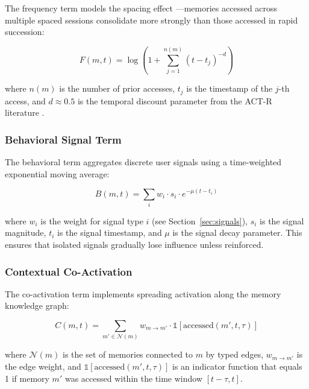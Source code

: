 \documentclass[11pt,a4paper]{article}
\begin{document}
The frequency term models the spacing effect \citep{cepeda2006distributed}---memories accessed across multiple spaced sessions consolidate more strongly than those accessed in rapid succession:

\begin{equation}
F(m, t) = \log\left(1 + \sum_{j=1}^{n(m)} (t - t_j)^{-d}\right)
\label{eq:frequency}
\end{equation}

\noindent where $n(m)$ is the number of prior accesses, $t_j$ is the timestamp of the $j$-th access, and $d \approx 0.5$ is the temporal discount parameter from the ACT-R literature \citep{anderson1991reflections}.

\subsubsection{Behavioral Signal Term}
\label{sec:behavioral}

The behavioral term aggregates discrete user signals using a time-weighted exponential moving average:

\begin{equation}
B(m, t) = \sum_{i} w_i \cdot s_i \cdot e^{-\mu(t - t_i)}
\label{eq:behavioral}
\end{equation}

\noindent where $w_i$ is the weight for signal type $i$ (see Section~\ref{sec:signals}), $s_i$ is the signal magnitude, $t_i$ is the signal timestamp, and $\mu$ is the signal decay parameter. This ensures that isolated signals gradually lose influence unless reinforced.

\subsubsection{Contextual Co-Activation}
\label{sec:coactivation}

The co-activation term implements spreading activation along the memory knowledge graph:

\begin{equation}
C(m, t) = \sum_{m' \in \mathcal{N}(m)} w_{m \to m'} \cdot \mathbb{1}[\text{accessed}(m', t, \tau)]
\label{eq:coactivation}
\end{equation}

\noindent where $\mathcal{N}(m)$ is the set of memories connected to $m$ by typed edges, $w_{m \to m'}$ is the edge weight, and $\mathbb{1}[\text{accessed}(m', t, \tau)]$ is an indicator function that equals 1 if memory $m'$ was accessed within the time window $[t - \tau, t]$.
\end{document}
